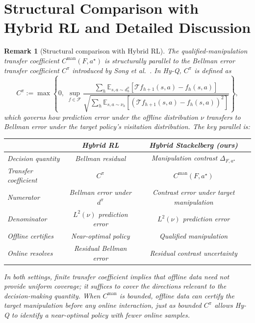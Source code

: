 \documentclass{article}
\newcommand{\E}{\mathbb{E}}           %
\newtheorem{remark}[theorem]{Remark}
\begin{document}
\section{Structural Comparison with Hybrid RL and Detailed Discussion}
\label{app:hybrid-rl-comparison}

\begin{remark}[Structural comparison with Hybrid RL]
\label{rem:comparison-hybrid-rl}
The qualified-manipulation transfer coefficient $C^{\mathrm{man}}(F,a^\star)$ is structurally parallel to the Bellman error transfer coefficient $C^\pi$ introduced by Song et al.\ \cite{song2022hybrid}. In Hy-Q, $C^\pi$ is defined as
\[
C^\pi := \max\left\{0,\; \sup_{f \in \mathcal{F}} \frac{\sum_{h} \E_{s,a \sim d_h^\pi}[\mathcal{T} f_{h+1}(s,a) - f_h(s,a)]}{\sqrt{\sum_h \E_{s,a \sim \nu_h}[(\mathcal{T} f_{h+1}(s,a) - f_h(s,a))^2]}}\right\},
\]
which governs how prediction error under the offline distribution $\nu$ transfers to Bellman error under the target policy's visitation distribution. The key parallel is:
\begin{center}
\begin{tabular}{lcc}
\toprule
& \textbf{Hybrid RL} \cite{song2022hybrid} & \textbf{Hybrid Stackelberg (ours)} \\
\midrule
Decision quantity & Bellman residual & Manipulation contrast $\Delta_{F,a^\star}$ \\
Transfer coefficient & $C^\pi$ & $C^{\mathrm{man}}(F,a^\star)$ \\
Numerator & Bellman error under $d^\pi$ & Contrast error under target manipulation \\
Denominator & $L^2(\nu)$ prediction error & $L^2(\nu)$ prediction error \\
Offline certifies & Near-optimal policy & Qualified manipulation \\
Online resolves & Residual Bellman error & Residual contrast uncertainty \\
\bottomrule
\end{tabular}
\end{center}
In both settings, finite transfer coefficient implies that offline data need not provide uniform coverage; it suffices to cover the directions relevant to the decision-making quantity. When $C^{\mathrm{man}}$ is bounded, offline data can certify the target manipulation before any online interaction, just as bounded $C^\pi$ allows Hy-Q to identify a near-optimal policy with fewer online samples.
\end{remark}
\end{document}
